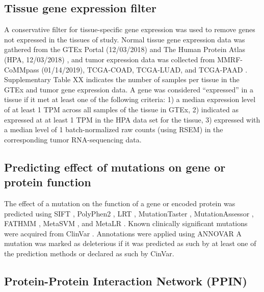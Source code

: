 \documentclass[english, 10pt, letterpaper]{article}
\begin{document}
\subsection*{Tissue gene expression filter}

A conservative filter for tissue-specific gene expression was used to remove genes not expressed in the tissues of study. 
Normal tissue gene expression data was gathered from the GTEx Portal (12/03/2018) \cite{GTExConsortium2017} and The Human Protein Atlas (HPA, 12/03/2018) \cite{Uhlen2015, Uhlen2016}, and tumor expression data was collected from MMRF-CoMMpass (01/14/2019), TCGA-COAD, TCGA-LUAD, and TCGA-PAAD \cite{CancerGenomeAtlasNetwork2012, CancerGenomeAtlasResearchNetwork2014, CancerGenomeAtlasResearchNetwork.Electronicaddress:andrew_aguirredfci.harvard.edu2017}. 
Supplementary Table XX indicates the number of samples per tissue in the GTEx and tumor gene expression data.
A gene was considered “expressed” in a tissue if it met at least one of the following criteria: 1) a median expression level of at least 1 TPM across all samples of the tissue in GTEx, 2) indicated as expressed at at least 1 TPM in the HPA data set for the tissue, 3) expressed with a median level of 1 batch-normalized raw counts (using RSEM) in the corresponding tumor RNA-sequencing data.


\subsection*{Predicting effect of mutations on gene or protein function}

The effect of a mutation on the function of a gene or encoded protein was predicted using SIFT \cite{Kumar2009, Vaser2016}, PolyPhen2 \cite{Adzhubei2010}, LRT \cite{Chun2009IdentificationGenomes.}, MutationTaster \cite{Schwarz2014MutationTaster2:Age.}, MutationAssessor \cite{Reva2007DeterminantsOptimization., Reva2011}, FATHMM \cite{Shihab2013}, MetaSVM \cite{Dong2015ComparisonStudies.}, and MetaLR \cite{Dong2015ComparisonStudies.}.
Known clinically significant mutations were acquired from ClinVar \cite{Landrum2018ClinVar:Evidence.}.
Annotations were applied using ANNOVAR \cite{Wang2010ANNOVAR:Data.}
A mutation was marked as deleterious if it was predicted as such by at least one of the prediction methods or declared as such by CinVar.


\subsection*{Protein-Protein Interaction Network (PPIN)}
\end{document}
